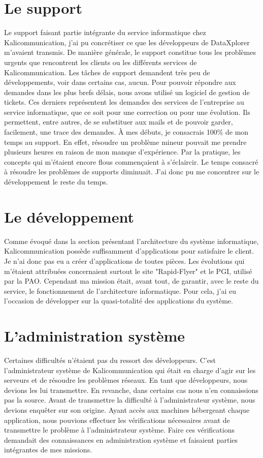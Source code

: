 
\section{Le support}
Le support faisant partie intégrante du service informatique chez Kalicommunication, j'ai pu concrétiser ce que les développeurs de DataXplorer m'avaient transmis. De manière générale, le support constitue tous les problèmes urgents que rencontrent les clients ou les différents services de Kalicommunication. Les tâches de support demandent très peu de développements, voir dans certains cas, aucun.\newline
Pour pouvoir répondre aux demandes dans les plus brefs délais, nous avons utilisé un logiciel de gestion de tickets. Ces derniers représentent les demandes des services de l'entreprise au service informatique, que ce soit pour une correction ou pour une évolution. Ils permettent, entre autres, de se substituer aux mails et de pouvoir garder, facilement, une trace des demandes.\newline
À mes débuts, je consacrais 100\% de mon temps au support. En effet, résoudre un problème mineur pouvait me prendre plusieurs heures en raison de mon manque d'expérience. Par la pratique, les concepts qui m'étaient encore flous commençaient à s'éclaircir. Le temps consacré à résoudre les problèmes de supports diminuait. J'ai donc pu me concentrer sur le développement le reste du temps.

\section{Le développement}
Comme évoqué dans la section présentant l'architecture du système informatique, Kalicommunication possède suffisamment d'applications pour satisfaire le client. Je n'ai donc pas eu a créer d'applications de toutes pièces. Les évolutions qui m'étaient attribuées concernaient surtout le site "Rapid-Flyer" et le PGI, utilisé par la PAO. Cependant ma mission était, avant tout, de garantir, avec le reste du service, le fonctionnement de l'architecture informatique. Pour cela, j'ai eu l'occasion de développer sur la quasi-totalité des applications du système.

\section{L'administration système}
Certaines difficultés n'étaient pas du ressort des développeurs. C'est l'administrateur système de Kalicommunication qui était en charge d'agir sur les serveurs et de résoudre les problèmes réseaux. En tant que développeurs, nous devions les lui transmettre. En revanche, dans certains cas nous n'en connaissions pas la source. Avant de transmettre la difficulté à l'administrateur système, nous devions enquêter sur son origine. Ayant accès aux machines hébergeant chaque application, nous pouvions effectuer les vérifications nécessaires avant de transmettre le problème à l'administrateur système.\newline
Faire ces vérifications demandait des connaissances en administration système et faisaient parties intégrantes de mes missions.